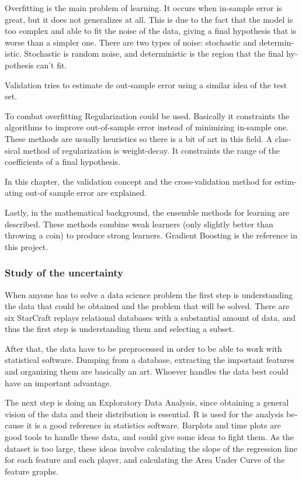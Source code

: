 \begin{otherlanguage}{british}
Overfitting is the main problem of learning. It occurs when in-sample error is
great, but it does not generalizes at all. This is due to the fact that the
model is too complex and able to fit the noise of the data, giving a final
hypothesis that is worse than a simpler one. There are two types of noise:
stochastic and deterministic. Stochastic is random noise, and deterministic
is the region that the final hypothesis can't fit.

Validation tries to estimate de out-sample error using a similar idea of the
test set.

To combat overfitting Regularization could be used. Basically it constraints
the algorithms to improve out-of-sample error instead of minimizing in-sample
one. These methods are usually heuristics so there is a bit of art in this
field. A classical method of regularization is weight-decay. It constraints
the range of the coefficients of a final hypothesis.

In this chapter, the validation concept and the cross-validation method for
estimating out-of sample error are explained.


Lastly, in the mathematical background, the ensemble methods for learning are
described. These methods combine weak learners (only slightly better than
throwing a coin) to produce strong learners. Gradient Boosting is the reference
in this project.

\subsubsection*{Study of the uncertainty}

When anyone has to solve a data science problem the first step is understanding
the data that could be obtained and the problem that will be solved. There are
six StarCraft replays relational databases with a substantial amount of data,
and thus the first step is understanding them and selecting a subset.

After that, the data have to be preprocessed in order to be able to work with
statistical software. Dumping from a database, extracting the important features
and organizing them are basically an art. Whoever handles the data best could
have an important advantage.

The next step is doing an Exploratory Data Analysis, since obtaining a general
vision of the data and their distribution is essential. R is used for the
analysis because it is a good reference in statistics software. Barplots and
time plots are good tools to handle these data, and could give some ideas to
fight them. As the dataset is too large, these ideas involve calculating the
slope of the regression line for each feature and each player, and calculating
the Area Under Curve of the feature graphs.


\end{otherlanguage}
